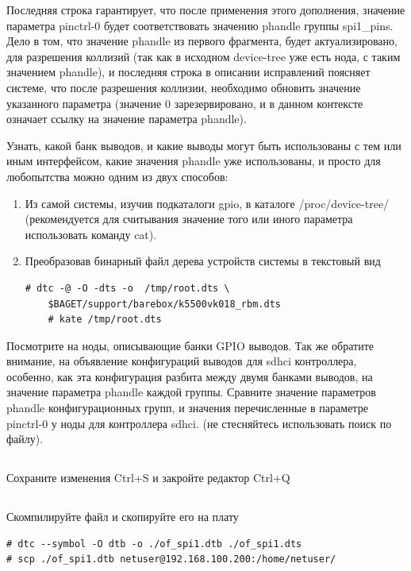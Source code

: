 Последняя строка гарантирует, что после применения этого дополнения, значение параметра pinctrl-0 будет соответствовать значению phandle группы spi1\_pins. Дело в том, что значение phandle из первого фрагмента, будет  актуализировано, для разрешения коллизий (так как в исходном device-tree уже есть нода, с таким значением phandle), и последняя строка в описании исправлений поясняет системе, что после разрешения коллизии, необходимо обновить значение указанного параметра (значение 0 зарезервировано, и в данном контексте означает ссылку на значение параметра phandle).  

Узнать, какой банк выводов, и какие выводы могут быть использованы с тем или иным интерфейсом, какие значения phandle уже использованы, и просто для любопытства можно одним из двух способов:

\begin{enumerate}
	\item Из самой системы, изучив подкаталоги gpio, в каталоге /proc/device-tree/ (рекомендуется для считывания значение того или иного параметра использовать команду cat). 
	
	\item Преобразовав бинарный файл дерева устройств системы в текстовый вид 
	\begin{lstlisting}[style=bash]
	# dtc -@ -O -dts -o  /tmp/root.dts \
	$BAGET/support/barebox/k5500vk018_rbm.dts
	# kate /tmp/root.dts
	\end{lstlisting}
\end{enumerate}

Посмотрите на ноды, описывающие банки GPIO выводов. Так же обратите внимание, на объявление конфигураций выводов для sdhci контроллера, особенно, как эта конфигурация разбита между двумя банками выводов, на значение параметра phandle каждой группы. Сравните значение параметров phandle конфигурационных групп, и значения перечисленные в параметре pinctrl-0 у ноды для контроллера  sdhci. (не стесняйтесь использовать поиск по файлу).

\subsection{} Сохраните изменения Ctrl+S и закройте редактор Ctrl+Q 

\subsection{} Скомпилируйте файл и скопируйте его на плату
\begin{lstlisting}[style=bash]
# dtc --symbol -O dtb -o ./of_spi1.dtb ./of_spi1.dts
# scp ./of_spi1.dtb netuser@192.168.100.200:/home/netuser/
\end{lstlisting}

